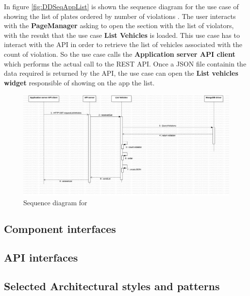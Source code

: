 In figure \ref{fig:DDSeqAppList} is shown the sequence diagram for the use case of showing the list of plates ordered by number of violations .
The user interacts with the \textbf{PageManager} asking to open the section with the list of violators, with the resukt that the use case \textbf{List Vehicles} is loaded. This use case has to interact with the API in order to retrieve the list of vehicles associated with the count of violation. So the use case calls the \textbf{Application server API client}  which performs the actual call to the REST API. Once a JSON file containin the data required is returned by the API, the use case can open the \textbf{List vehicles widget} responsible of showing on the app the list.


\begin{figure}[H]
\centering
\includegraphics[width=\textwidth]{Images/DDSeqSeverList.png}
\caption{\label{fig:DDSeqSeverForm} Sequence diagram for }
\end{figure}



\subsection{Component interfaces}


\subsection{API interfaces}




\subsection{Selected Architectural styles and patterns}
 \label{cleanArchiref}
